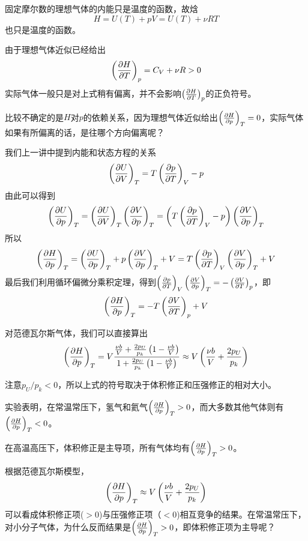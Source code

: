 \documentclass[CJK]{beamer}
\begin{document}
\begin{frame}
\bch
固定摩尔数的理想气体的内能只是温度的函数，故焓
$$H = U(T) + pV = U(T) + \nu R T$$
也只是温度的函数。
\ech
\end{frame}

\begin{frame}
\bch
由于理想气体近似已经给出
$$\pfrac HTp =  C_V+ \nu R > 0$$
实际气体一般只是对上式稍有偏离，并不会影响$\pfrac HTp $的正负符号。

比较不确定的是$H$对$p$的依赖关系，因为理想气体近似给出$\pfrac HpT = 0$，实际气体如果有所偏离的话，是往哪个方向偏离呢？
\ech
\end{frame}

\begin{frame}
\bch
{\small
我们上一讲中提到内能和状态方程的关系{\blue
$$\pfrac UVT = T\pfrac pTV - p$$}
由此可以得到
$$\pfrac UpT = \pfrac UVT\pfrac VpT= \left(T\pfrac pTV - p\right) \pfrac VpT$$
所以
$$\pfrac HpT = \pfrac UpT  + p\pfrac VpT + V = T\pfrac pTV \pfrac VpT + V$$
最后我们利用循环偏微分乘积定理，得到$\pfrac pTV \pfrac VpT = - \pfrac VTp$，即
{\blue
$$\pfrac HpT = - T\pfrac VTp + V$$
}}
\ech
\end{frame}



\begin{frame}
\bch

对范德瓦尔斯气体，我们可以直接算出
$$\pfrac HpT = V\frac{\frac{\nu b}{V} + \frac{2p_U}{p_k}\left(1- \frac{\nu b}{V}\right)}{1 + \frac{2p_U}{p_k}\left(1-\frac{\nu b}{V}\right)}\approx V\left(\frac{\nu b}{V} +\frac{2p_U}{p_k}\right)$$

注意$p_U/p_k<0$，所以上式的符号取决于体积修正和压强修正的相对大小。

\emini
{}
{\small 
实验表明，在常温常压下，氢气和氦气$\pfrac HpT > 0$，而大多数其他气体则有$\pfrac HpT < 0$。

在高温高压下，体积修正是主导项，所有气体均有$\pfrac HpT > 0$。
}
\emini

\ech
\end{frame}

\begin{frame}
\bch
{}

根据范德瓦尔斯模型，$$\pfrac HpT\approx V\left(\frac{\nu b}{V} + \frac{2p_U}{p_k}\right)$$
可以看成体积修正项($>0$)与压强修正项（$<0$)相互竞争的结果。在常温常压下，对小分子气体，为什么反而结果是$\pfrac HpT > 0$，即体积修正项为主导呢？

\ech
\end{frame}
\end{document}
